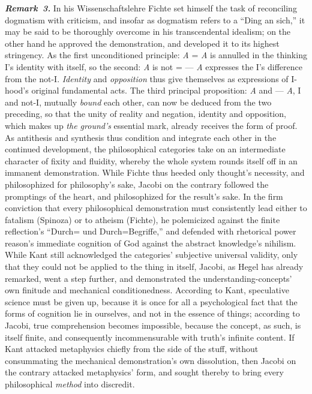 \documentclass[12pt]{book}
\newcommand{\anm}[1]{\emph{\textbf{Remark~#1.}}}
\begin{document}
\anm{3} In his Wissenschaftslehre Fichte set himself the task of reconciling
dogmatism with criticism, and insofar as dogmatism refers to a ``Ding an
sich,'' it may be said to be thoroughly overcome in his transcendental
idealism; on the other hand he approved the demonstration, and developed it
to its highest stringency. As the first unconditioned principle: \textit{A}
= \textit{A} is annulled in the thinking I's identity with itself, so the
second: \textit{A} is not = --- \textit{A} expresses the I's difference from
the not-I. \emph{Identity} and \emph{opposition} thus give themselves as
expressions of I-hood's original fundamental acts. The third principal
proposition: \textit{A} and --- \textit{A}, I and not-I, mutually
\emph{bound} each other, can now be deduced from the two preceding, so that
the unity of reality and negation, identity and opposition, which makes up
\emph{the ground's} essential mark, already receives the form of proof. As
antithesis and synthesis thus condition and integrate each other in the
continued development, the philosophical categories take on an intermediate
character of fixity and fluidity, whereby the whole system rounds itself off
in an immanent demonstration. While Fichte thus heeded only thought's
necessity, and philosophized for philosophy's sake, Jacobi on the contrary
followed the promptings of the heart, and philosophized for the result's
sake. In the firm conviction that every philosophical demonstration must
consistently lead either to fatalism (Spinoza) or to atheism (Fichte), he
polemicized against the finite reflection's ``Durch= und Durch=Begriffe,''
and defended with rhetorical power reason's immediate cognition of God
against the abstract knowledge's nihilism. While Kant still acknowledged the
categories' subjective universal validity, only that they could not be
applied to the thing in itself, Jacobi, as Hegel has already remarked, went
a step further, and demonstrated the understanding-concepts' own finitude
and mechanical conditionedness. According to Kant, speculative science must
be given up, because it is once for all a psychological fact that the forms
of cognition lie in ourselves, and not in the essence of things; according
to Jacobi, true comprehension becomes impossible, because the concept, as
such, is itself finite, and consequently incommensurable with truth's
infinite content. If Kant attacked metaphysics chiefly from the side of the
stuff, without consummating the mechanical demonstration's own dissolution,
then Jacobi on the contrary attacked metaphysics' form, and sought thereby
to bring every philosophical \emph{method} into discredit.
\end{document}
